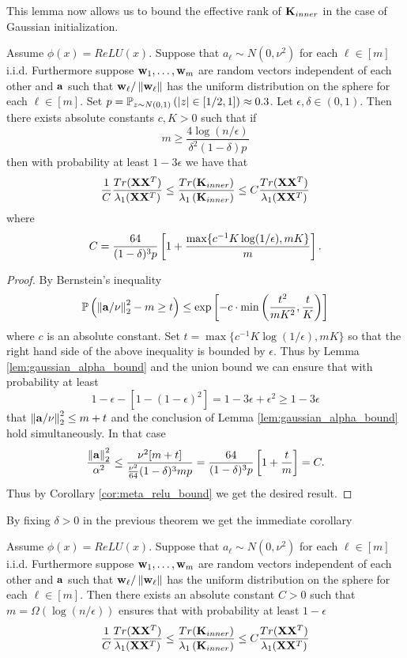 This lemma now allows us to bound the effective rank of $\mathbf{K}_{inner}$ in the case of Gaussian initialization.
\begin{theorem}\label{thm:inner_gaussian}
Assume $\phi(x) = ReLU(x)$.  Suppose that $a_\ell \sim N(0, \nu^2)$ for each $\ell \in [m]$ i.i.d.  Furthermore suppose $\mathbf{w}_1, \ldots, \mathbf{w}_m$ are random vectors independent of each other and $\mathbf{a}$ such that $\mathbf{w}_\ell / \left\lVert\mathbf{w}_\ell\right\rVert$ has the uniform distribution on the sphere for each $\ell \in [m]$.  Set $p = \mathbb{P}_{z \sim N(0, 1)}\left(|z| \in [1/2, 1]\right) \approx 0.3$.  Let $\epsilon, \delta \in (0, 1)$.  Then there exists absolute constants $c, K > 0$ such that if \[m \geq \frac{4 \log(n / \epsilon)}{\delta^2 (1 - \delta) p}\]
then with probability at least $1 - 3\epsilon$ we have that
\[ \frac{1}{C}\frac{Tr(\mathbf{X} \mathbf{X}^T)}{\lambda_1(\mathbf{X} \mathbf{X}^T)} \leq \frac{Tr(\mathbf{K}_{inner})}{\lambda_1 \left(\mathbf{K}_{inner}\right)} \leq C \frac{Tr(\mathbf{X} \mathbf{X}^T)}{\lambda_1(\mathbf{X} \mathbf{X}^T)} \]
where
\[C = \frac{64}{(1 - \delta)^3 p}\left[1 + \frac{\max\{c^{-1} K \log(1/\epsilon), mK \}}{m}\right]  . 
\]
\end{theorem}

\begin{proof}
By Bernstein's inequality
\[ \mathbb{P}\left(\left\lVert\mathbf{a} / \nu\right\rVert_2^2 - m\geq t\right) \leq \exp\left[-c \cdot  \min\left(\frac{t^2}{m K^2 }, \frac{t}{K}\right)\right] \]
where $c$ is an absolute constant.  Set $t = \max\{c^{-1} K \log(1/\epsilon), mK \}$ so that the right hand side of the above inequality is bounded by $\epsilon$.  Thus by Lemma \ref{lem:gaussian_alpha_bound} and the union bound we can ensure that with probability at least 
\[1 - \epsilon - [1 - (1-\epsilon)^2] = 1 - 3 \epsilon + \epsilon^2 \geq 1 - 3 \epsilon \] 
that $\left\lVert\mathbf{a} / \nu\right\rVert_2^2 \leq m + t$ and the conclusion of Lemma \ref{lem:gaussian_alpha_bound} hold simultaneously.  In that case
\begin{gather*}
\frac{\left\lVert\mathbf{a}\right\rVert_2^2}{\alpha^2} \leq \frac{\nu^2[m + t]}{\frac{\nu^2}{64} (1 - \delta)^{3} m p} = \frac{64}{(1 - \delta)^3 p}\left[1 + \frac{t}{m}\right] = C . 
\end{gather*}
Thus by Corollary \ref{cor:meta_relu_bound} we get the desired result.
\end{proof}

\par 
By fixing $\delta > 0$ in the previous theorem we get the immediate corollary
\begin{corollary}\label{cor:inner_eff_rank_bd}
Assume $\phi(x) = ReLU(x)$.  Suppose that $a_\ell \sim N(0, \nu^2)$ for each $\ell \in [m]$ i.i.d.  Furthermore suppose $\mathbf{w}_1, \ldots, \mathbf{w}_m$ are random vectors independent of each other and $\mathbf{a}$ such that $\mathbf{w}_\ell / \left\lVert\mathbf{w}_\ell\right\rVert$ has the uniform distribution on the sphere for each $\ell \in [m]$.  Then there exists an absolute constant $C > 0$ such that $m = \Omega(\log(n / \epsilon))$ ensures that with probability at least $1 - \epsilon$
\[ \frac{1}{C}\frac{Tr(\mathbf{X} \mathbf{X}^T)}{\lambda_1(\mathbf{X} \mathbf{X}^T)} \leq \frac{Tr(\mathbf{K}_{inner})}{\lambda_1 \left(\mathbf{K}_{inner}\right)} \leq C\frac{Tr(\mathbf{X} \mathbf{X}^T)}{\lambda_1(\mathbf{X} \mathbf{X}^T)} \]
\end{corollary}


